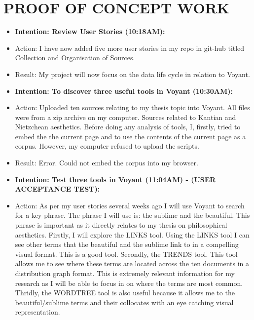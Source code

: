 \documentclass[a4paper,12pt]{article}
\begin{document}
\section{PROOF OF CONCEPT WORK}


\begin{itemize} 

\item \textbf{Intention: Review User Stories (10:18AM):}

\item Action: I have now added five more user stories in my repo in git-hub titled Collection and Organisation of Sources.

\item Result: My project will now focus on the data life cycle in relation to Voyant. 


\item \textbf{Intention: To discover three useful tools in Voyant (10:30AM):}


\item Action: Uploaded ten sources relating to my thesis topic into Voyant. All files were from a zip archive on my computer. Sources related to Kantian and Nietzchean aesthetics. Before doing any analysis of tools, I, firstly, tried to embed the the current page and to use the contents of the current page as a corpus. However, my computer refused to upload the scripts. 


\item Result: Error. Could not embed the corpus into my browser. 


\item \textbf{Intention: Test three tools in Voyant (11:04AM) - (USER ACCEPTANCE TEST):}


\item Action: As per my user stories several weeks ago I will use Voyant to search for a key phrase. The phrase I will use is: the sublime and the beautiful. This phrase is important as it directly relates to my thesis on philosophical aesthetics. Firstly, I will explore the LINKS tool. Using the LINKS tool I can see other terms that the beautiful and the sublime link to in a compelling visual format. This is a good tool. Secondly, the TRENDS tool. This tool allows me to see where these terms are located across the ten documents in a distribution graph format. This is extremely relevant information for my research as I will be able to focus in on where the terms are most common. Thridly, the WORDTREE tool is also useful because it allows me to the beautiful/sublime terms and their collocates with an eye catching visual representation. 



\end{itemize}
\end{document}
